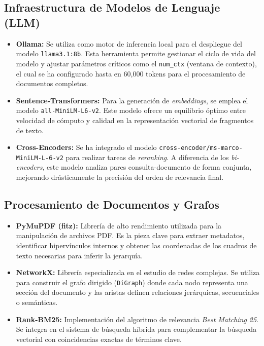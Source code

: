 \subsection{Infraestructura de Modelos de Lenguaje (LLM)}
\begin{itemize}
    \item \textbf{Ollama:} Se utiliza como motor de inferencia local para el despliegue del modelo \texttt{llama3.1:8b}. Esta herramienta permite gestionar el ciclo de vida del modelo y ajustar parámetros críticos como el \texttt{num\_ctx} (ventana de contexto), el cual se ha configurado hasta en 60,000 tokens para el procesamiento de documentos completos.
    \item \textbf{Sentence-Transformers:} Para la generación de \textit{embeddings}, se emplea el modelo \texttt{all-\allowbreak MiniLM-\allowbreak L6-v2}. Este modelo ofrece un equilibrio óptimo entre velocidad de cómputo y calidad en la representación vectorial de fragmentos de texto.
    \item \textbf{Cross-Encoders:} Se ha integrado el modelo \nolinkurl{cross-encoder/ms-marco-MiniLM-L-6-v2} para realizar tareas de \textit{reranking}. A diferencia de los \textit{bi-encoders}, este modelo analiza pares consulta-documento de forma conjunta, mejorando drásticamente la precisión del orden de relevancia final.
\end{itemize}

\subsection{Procesamiento de Documentos y Grafos}
\begin{itemize}
    \item \textbf{PyMuPDF (fitz):} Librería de alto rendimiento utilizada para la manipulación de archivos PDF. Es la pieza clave para extraer metadatos, identificar hipervínculos internos y obtener las coordenadas de los cuadros de texto necesarias para inferir la jerarquía.
    \item \textbf{NetworkX:} Librería especializada en el estudio de redes complejas. Se utiliza para construir el grafo dirigido (\texttt{DiGraph}) donde cada nodo representa una sección del documento y las aristas definen relaciones jerárquicas, secuenciales o semánticas.
    \item \textbf{Rank-BM25:} Implementación del algoritmo de relevancia \textit{Best Matching 25}. Se integra en el sistema de búsqueda híbrida para complementar la búsqueda vectorial con coincidencias exactas de términos clave.
\end{itemize}

